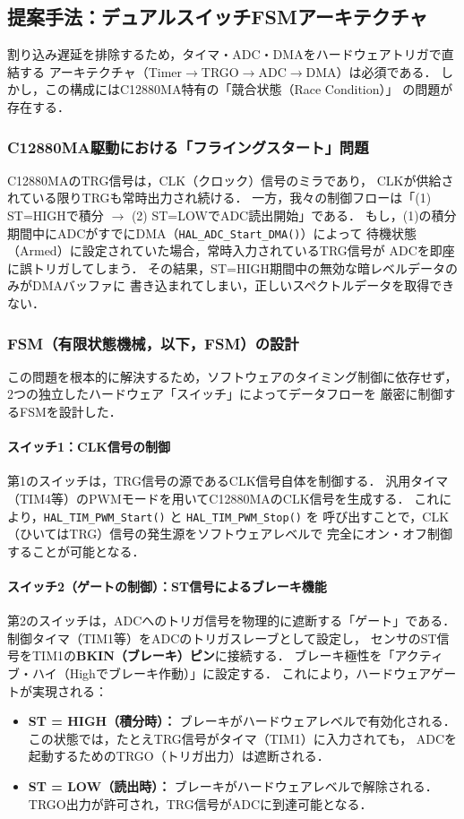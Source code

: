 \documentclass[main]{subfiles}
\begin{document}
\subsection{提案手法：デュアルスイッチFSMアーキテクチャ}
\label{sec:new_architecture}
割り込み遅延を排除するため，タイマ・ADC・DMAをハードウェアトリガで直結する
アーキテクチャ（Timer$\rightarrow$TRGO$\rightarrow$ADC$\rightarrow$DMA）は必須である．
しかし，この構成にはC12880MA特有の「競合状態（Race Condition）」
の問題が存在する．

\subsubsection{C12880MA駆動における「フライングスタート」問題} 
C12880MAのTRG信号は，CLK（クロック）信号のミラであり，
CLKが供給されている限りTRGも常時出力され続ける．
一方，我々の制御フローは「(1) ST=HIGHで積分 $\rightarrow$ (2) ST=LOWでADC読出開始」である．
もし，(1)の積分期間中にADCがすでにDMA（\texttt{HAL\_ADC\_Start\_DMA()}）によって
待機状態（Armed）に設定されていた場合，常時入力されているTRG信号が
ADCを即座に誤トリガしてしまう．
その結果，ST=HIGH期間中の無効な暗レベルデータのみがDMAバッファに
書き込まれてしまい，正しいスペクトルデータを取得できない．


\subsubsection{FSM（有限状態機械，以下，FSM）の設計}
この問題を根本的に解決するため，ソフトウェアのタイミング制御に依存せず，
2つの独立したハードウェア「スイッチ」によってデータフローを
厳密に制御するFSMを設計した．

\paragraph{スイッチ1：CLK信号の制御}
第1のスイッチは，TRG信号の源であるCLK信号自体を制御する．
汎用タイマ（TIM4等）のPWMモードを用いてC12880MAのCLK信号を生成する．
これにより，\texttt{HAL\_TIM\_PWM\_Start()} と \texttt{HAL\_TIM\_PWM\_Stop()} を
呼び出すことで，CLK（ひいてはTRG）信号の発生源をソフトウェアレベルで
完全にオン・オフ制御することが可能となる．

\paragraph{スイッチ2（ゲートの制御）：ST信号によるブレーキ機能}
第2のスイッチは，ADCへのトリガ信号を物理的に遮断する「ゲート」である．
制御タイマ（TIM1等）をADCのトリガスレーブとして設定し，
センサのST信号をTIM1の\textbf{BKIN（ブレーキ）ピン}に接続する．
ブレーキ極性を「アクティブ・ハイ（Highでブレーキ作動）」に設定する．
これにより，ハードウェアゲートが実現される：
\begin{itemize}
    \item \textbf{ST = HIGH（積分時）：} ブレーキがハードウェアレベルで有効化される．
    この状態では，たとえTRG信号がタイマ（TIM1）に入力されても，
    ADCを起動するためのTRGO（トリガ出力）は遮断される．
    \item \textbf{ST = LOW（読出時）：} ブレーキがハードウェアレベルで解除される．
    TRGO出力が許可され，TRG信号がADCに到達可能となる．
\end{itemize}
\end{document}
